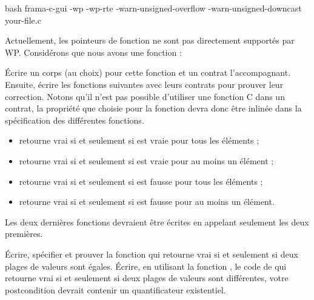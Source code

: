 \begin{CodeBlock}{bash}
frama-c-gui -wp -wp-rte -warn-unsigned-overflow -warn-unsigned-downcast your-file.c
\end{CodeBlock}




Actuellement, les pointeurs de fonction ne sont pas directement supportés par WP.
Considérons que nous avons une fonction :




Écrire un corps (au choix) pour cette fonction et un contrat l'accompagnant.
Ensuite, écrire les fonctions suivantes avec leurs contrats pour prouver leur
correction. Notons qu'il n'est pas possible d'utiliser une fonction C dans un
contrat, la propriété que choisie pour la fonction 
devra donc être inlinée dans la spécification des différentes fonctions.


\begin{itemize}
\item {} retourne vrai si et seulement si 
  est vraie pour tous les éléments ;
\item {} retourne vrai si et seulement si 
  est vraie pour au moins un élément ;
\item {} retourne vrai si et seulement si 
  est fausse pour tous les éléments ;
\item {} retourne vrai si et seulement si 
  est fausse pour au moins un élément.
\end{itemize}


Les deux dernières fonctions devraient être écrites en appelant seulement les deux
premières.




Écrire, spécifier et prouver la fonction  qui retourne vrai
si et seulement si deux plages de valeurs sont égales. Écrire, en utilisant la
fonction , le code de  qui retourne vrai
si et seulement si deux plages de valeurs sont différentes, votre postcondition
devrait contenir un quantificateur existentiel.




\label{l4:statements-loops-ex-bsearch}


